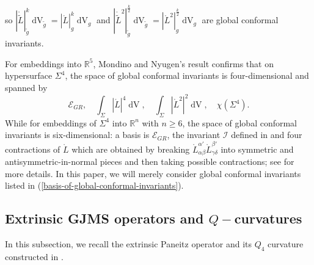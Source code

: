 \documentclass[11pt,letterpaper]{amsart}
\DeclareMathOperator{\dvol}{dV}
\newcommand{\cg}{\widetilde{g}}
\newcommand{\cL}{\widetilde{L}}
\newcommand{\mE}{\mathcal{E}}
\newcommand{\bR}{\mathbb{R}}
\theoremstyle{definition}
\theoremstyle{remark}
\newtheorem{remark}[theorem]{Remark}
\numberwithin{equation}{section}
\begin{document}
so $|\mathring{\cL}|_{\cg}^k \dvol_{\cg}=|\mathring{L}|_{g}^k \dvol_{g}$ and $|\mathring{\cL}^2|_{\cg}^{\frac{k}{2}}\dvol_{\cg}=|\mathring{L}^2|_{g}^{\frac{k}{2}}\dvol_{g}$ are global conformal invariants.

For embeddings into $\bR^5$, Mondino and Nyugen's result\cite[Theorem 4.1]{Mondino-Nguyen18} confirms that on hypersurface $\Sigma^4$, the space of global conformal invariants is four-dimensional and spanned by 
\begin{equation}\label{basis-of-global-conformal-invariants}
 \mE_{GR},\quad   \int_{\Sigma} |\mathring{L}|^4\dvol,\quad  \int_{\Sigma}|\mathring{L}^2|^2 \dvol, \quad \chi(\Sigma^4).
\end{equation}
While for embeddings of $\Sigma^4$ into $\bR^n$ with $n \geq 6$, the space of global conformal invariants is six-dimensional: a basis is $\mE_{GR}$, the invariant $\mathcal{I}$ defined in \cite{CGKTW25} and four contractions of $\mathring{L}$ which are obtained by breaking $\mathring{L}_{\alpha\beta}^{\alpha'}\mathring{L}_{\gamma\delta}^{\beta'}$ into symmetric and antisymmetric-in-normal pieces and then taking possible contractions; see \cite[Section 6]{CGKTW25} for more details. In this paper, we will merely consider global conformal invariants listed in (\ref{basis-of-global-conformal-invariants}).

\subsection{Extrinsic GJMS operators and $Q-$curvatures}
In this subsection, we recall the extrinsic Paneitz operator and its $Q_4$ curvature constructed in \cite{Case-Graham-Kuo}.
\end{document}
